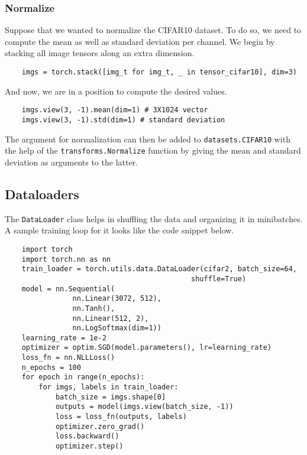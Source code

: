 \documentclass[11pt]{article}
\begin{document}
\subsubsection{Normalize}
\label{sec:org3893545}
Suppose that we wanted to normalize the CIFAR10 dataset. To do so, we need to compute the mean as well as standard deviation per channel. We begin by stacking all image tensors along an extra dimension.
\begin{verbatim}
    imgs = torch.stack([img_t for img_t, _ in tensor_cifar10], dim=3)
\end{verbatim}
And now, we are in a position to compute the desired values.
\begin{verbatim}
    imgs.view(3, -1).mean(dim=1) # 3X1024 vector
    imgs.view(3, -1).std(dim=1) # standard deviation
\end{verbatim}
The argument for normalization can then be added to \texttt{datasets.CIFAR10} with the help of the \texttt{transforms.Normalize} function by giving the mean and standard deviation as arguments to the latter.

\subsection{Dataloaders}
\label{sec:org04ba8fc}
The \texttt{DataLoader} class helps in shuffling the data and organizing it in minibatches. A sample training loop for it looks like the code snippet below.
\begin{verbatim}
    import torch
    import torch.nn as nn
    train_loader = torch.utils.data.DataLoader(cifar2, batch_size=64,
                                            shuffle=True)
    model = nn.Sequential(
                nn.Linear(3072, 512),
                nn.Tanh(),
                nn.Linear(512, 2),
                nn.LogSoftmax(dim=1))
    learning_rate = 1e-2
    optimizer = optim.SGD(model.parameters(), lr=learning_rate)
    loss_fn = nn.NLLLoss()
    n_epochs = 100
    for epoch in range(n_epochs):
        for imgs, labels in train_loader:
            batch_size = imgs.shape[0]
            outputs = model(imgs.view(batch_size, -1))
            loss = loss_fn(outputs, labels)
            optimizer.zero_grad()
            loss.backward()
            optimizer.step()
\end{verbatim}
\end{document}
